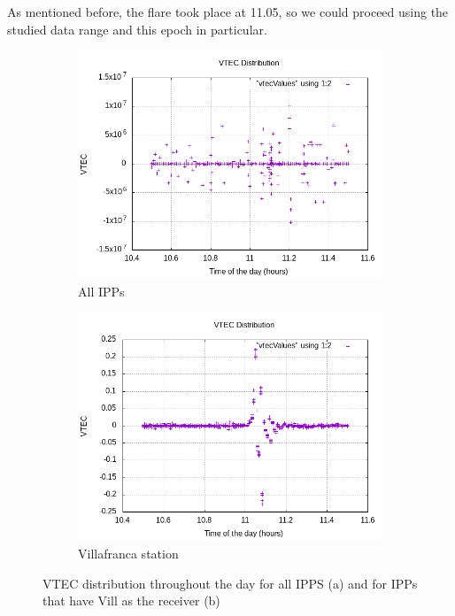 As mentioned before, the flare took place at 11.05, so we could proceed using the studied data range and this epoch in particular.

\clearpage

\begin{figure}[!htb]
	\begin{subfigure}[b]{0.5\textwidth}
		\includegraphics[width=\linewidth]{images/ch4/vtecDistributionGeneral.png}
		\caption{All IPPs}
	\end{subfigure}
	\hfill
	\begin{subfigure}[b]{0.5\textwidth}
		\includegraphics[width=\linewidth]{images/ch4/vtecDistributionVill.png}
		\caption{Villafranca station}
	\end{subfigure}
	\caption{VTEC distribution throughout the day for all IPPS (a) and for IPPs that have Vill as the receiver (b)}
	\label{fig:vtecDistribution}
\end{figure}

